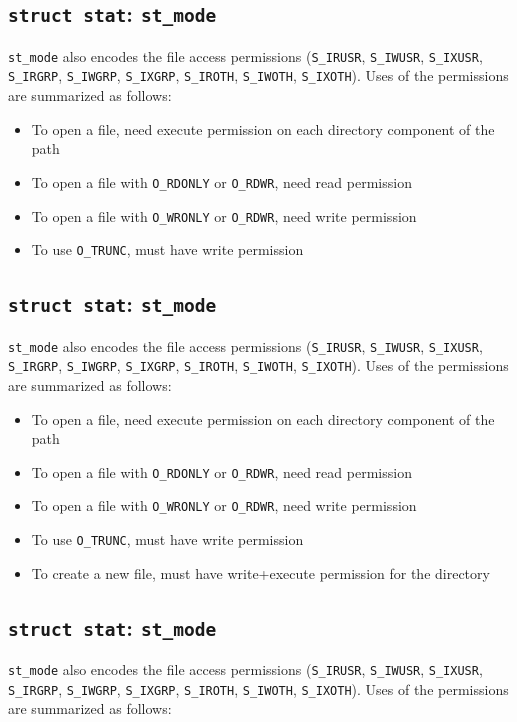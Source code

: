 \documentclass[xga]{xdvislides}
\begin{document}
\subsection{{\tt struct stat}: {\tt st\_mode}}
{\tt st\_mode} also encodes the file access permissions ({\tt S\_IRUSR},
{\tt S\_IWUSR}, {\tt S\_IXUSR}, {\tt S\_IRGRP}, {\tt S\_IWGRP}, {\tt S\_IXGRP},
{\tt S\_IROTH}, {\tt S\_IWOTH}, {\tt S\_IXOTH}).  Uses of the permissions are
summarized as follows:

\begin{itemize}
	\item To open a file, need execute permission on each directory component of the path
	\item To open a file with {\tt O\_RDONLY} or {\tt O\_RDWR}, need read permission
	\item To open a file with {\tt O\_WRONLY} or {\tt O\_RDWR}, need write permission
	\item To use {\tt O\_TRUNC}, must have write permission
\end{itemize}


\subsection{{\tt struct stat}: {\tt st\_mode}}
{\tt st\_mode} also encodes the file access permissions ({\tt S\_IRUSR},
{\tt S\_IWUSR}, {\tt S\_IXUSR}, {\tt S\_IRGRP}, {\tt S\_IWGRP}, {\tt S\_IXGRP},
{\tt S\_IROTH}, {\tt S\_IWOTH}, {\tt S\_IXOTH}).  Uses of the permissions are
summarized as follows:

\begin{itemize}
	\item To open a file, need execute permission on each directory component of the path
	\item To open a file with {\tt O\_RDONLY} or {\tt O\_RDWR}, need read permission
	\item To open a file with {\tt O\_WRONLY} or {\tt O\_RDWR}, need write permission
	\item To use {\tt O\_TRUNC}, must have write permission
	\item To create a new file, must have write+execute permission for the directory
\end{itemize}


\subsection{{\tt struct stat}: {\tt st\_mode}}
{\tt st\_mode} also encodes the file access permissions ({\tt S\_IRUSR},
{\tt S\_IWUSR}, {\tt S\_IXUSR}, {\tt S\_IRGRP}, {\tt S\_IWGRP}, {\tt S\_IXGRP},
{\tt S\_IROTH}, {\tt S\_IWOTH}, {\tt S\_IXOTH}).  Uses of the permissions are
summarized as follows:
\end{document}
